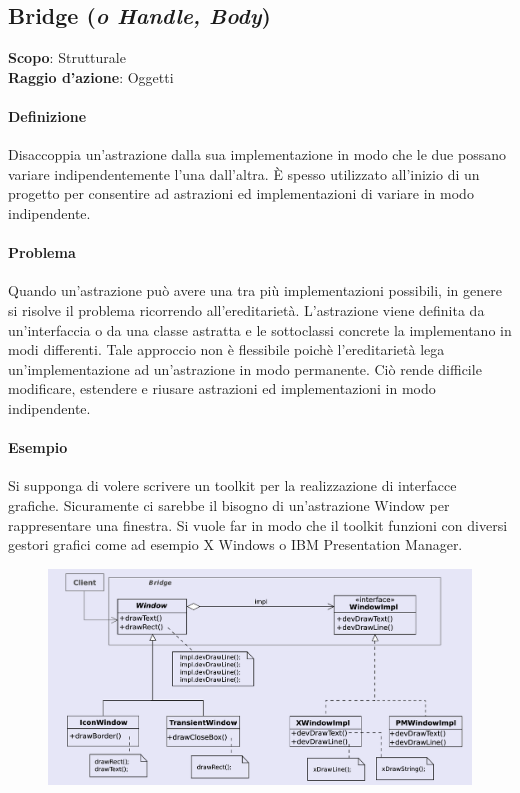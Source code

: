 \subsection{Bridge (\textit{o Handle, Body})}
\label{bridge}

\textbf{Scopo}: Strutturale \\
\textbf{Raggio d'azione}: Oggetti

\paragraph{Definizione} Disaccoppia un’astrazione dalla sua implementazione in modo che le due possano variare indipendentemente l’una dall’altra. È spesso utilizzato all’inizio di un progetto per consentire ad astrazioni ed implementazioni di variare in modo indipendente.

\paragraph{Problema} Quando un’astrazione può avere una tra più implementazioni possibili, in genere si risolve il problema ricorrendo all’ereditarietà. L’astrazione viene definita da un’interfaccia o da una classe astratta e le sottoclassi concrete la implementano in modi differenti. Tale approccio non è flessibile poichè l’ereditarietà lega un’implementazione ad un’astrazione in modo permanente. Ciò rende difficile modificare, estendere e riusare astrazioni ed implementazioni in modo indipendente.

\paragraph{Esempio} Si supponga di volere scrivere un toolkit per la realizzazione di interfacce grafiche. Sicuramente ci sarebbe il bisogno di un’astrazione Window per rappresentare una finestra. Si vuole far in modo che il toolkit funzioni con diversi gestori grafici come ad esempio X Windows o IBM Presentation Manager.

\begin{figure}[H]
    \centering
    \includegraphics[width=1\linewidth]{assets/pattern/bridge/bridge-esempio.png}
\end{figure}

